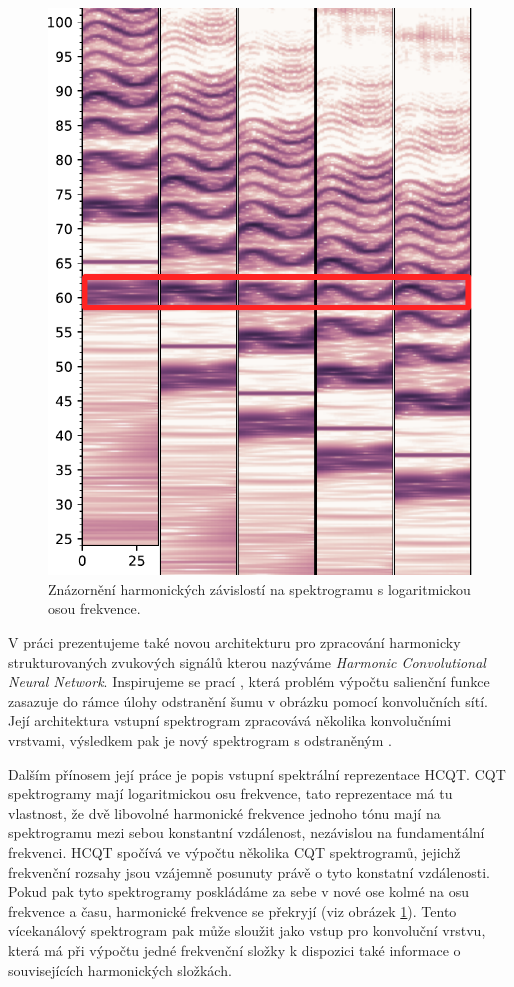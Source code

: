 \begin{figure}[h]\centering
    \includegraphics[scale=0.5]{../img/spectrograms}
\caption{Znázornění harmonických závislostí na spektrogramu s logaritmickou osou frekvence.}\label{obr:hcqt}
\end{figure}

V práci prezentujeme také novou architekturu pro zpracování harmonicky strukturovaných zvukových signálů kterou nazýváme \emph{Harmonic Convolutional Neural Network}. Inspirujeme se prací \cite{Bittner2017}, která problém výpočtu salienční funkce zasazuje do rámce úlohy odstranění šumu v obrázku pomocí konvolučních sítí. Její architektura vstupní spektrogram zpracovává několika konvolučními vrstvami, výsledkem pak je nový spektrogram s odstraněným . 

Dalším přínosem její práce je popis vstupní spektrální reprezentace HCQT. CQT spektrogramy mají logaritmickou osu frekvence, tato reprezentace má tu vlastnost, že dvě libovolné harmonické frekvence jednoho tónu mají na spektrogramu mezi sebou konstantní vzdálenost, nezávislou na fundamentální frekvenci. HCQT spočívá ve výpočtu několika CQT spektrogramů, jejichž frekvenční rozsahy jsou vzájemně posunuty právě o tyto konstatní vzdálenosti. Pokud pak tyto spektrogramy poskládáme za sebe v nové ose kolmé na osu frekvence a času, harmonické frekvence se překryjí (viz obrázek \ref{obr:hcqt}). Tento vícekanálový spektrogram pak může sloužit jako vstup pro konvoluční vrstvu, která má při výpočtu jedné frekvenční složky k dispozici také informace o souvisejících harmonických složkách.

